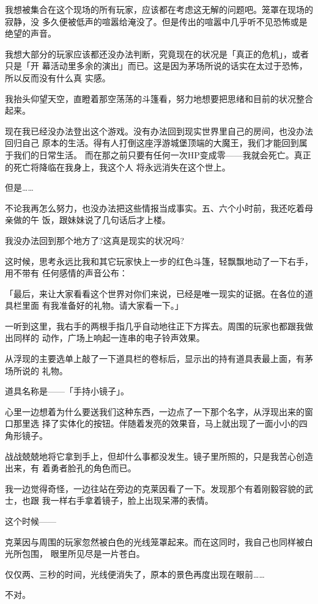 \documentclass[11pt]{book}
\begin{document}
我想被集合在这个现场的所有玩家，应该都在考虑这无解的问题吧。笼罩在现场的寂静，没
多久便被低声的喧嚣给淹没了。但是传出的喧嚣中几乎听不见恐怖或是绝望的声音。

我想大部分的玩家应该都还没办法判断，究竟现在的状况是「真正的危机」，或者只是「开
幕活动里多余的演出」而已。这是因为茅场所说的话实在太过于恐怖，所以反而没有什么真
实感。

我抬头仰望天空，直瞪着那空荡荡的斗篷看，努力地想要把思绪和目前的状况整合起来。

现在我已经没办法登出这个游戏。没有办法回到现实世界里自己的房间，也没办法回归自己
原本的生活。得有人打倒这座浮游城堡顶端的大魔王，我们才能回到属于我们的日常生活。
而在那之前只要有任何一次HP变成零——我就会死亡。真正的死亡将降临在我身上，我这个人
将永远消失在这个世上。

但是……

不论我再怎么努力，也没办法把这些情报当成事实。五、六个小时前，我还吃着母亲做的午
饭，跟妹妹说了几句话后才上楼。

我没办法回到那个地方了?这真是现实的状况吗?

这时候，思考永远比我和其它玩家快上一步的红色斗篷，轻飘飘地动了一下右手，用不带有
任何感情的声音公布：

「最后，来让大家看看这个世界对你们来说，已经是唯一现实的证据。在各位的道具栏里面
有我准备好的礼物。请大家看一下。」

一听到这里，我右手的两根手指几乎自动地往正下方挥去。周围的玩家也都跟我做出同样的
动作，广场上响起一连串的电子铃声效果。

从浮现的主要选单上敲了一下道具栏的卷标后，显示出的持有道具表最上面，有茅场所说的
礼物。

道具名称是——「手持小镜子」。

心里一边想着为什么要送我们这种东西，一边点了一下那个名字，从浮现出来的窗口那里选
择了实体化的按钮。伴随着发亮的效果音，马上就出现了一面小小的四角形镜子。

战战兢兢地将它拿到手上，但却什么事都没发生。镜子里所照的，只是我苦心创造出来，有
着勇者脸孔的角色而已。

我一边觉得奇怪，一边往站在旁边的克莱因看了一下。发现那个有着刚毅容貌的武士，也跟
我一样右手拿着镜子，脸上出现呆滞的表情。

这个时候——

克莱因与周围的玩家忽然被白色的光线笼罩起来。而在这同时，我自己也同样被白光所包围，
眼里所见尽是一片苍白。

仅仅两、三秒的时间，光线便消失了，原本的景色再度出现在眼前……

不对。
\end{document}
